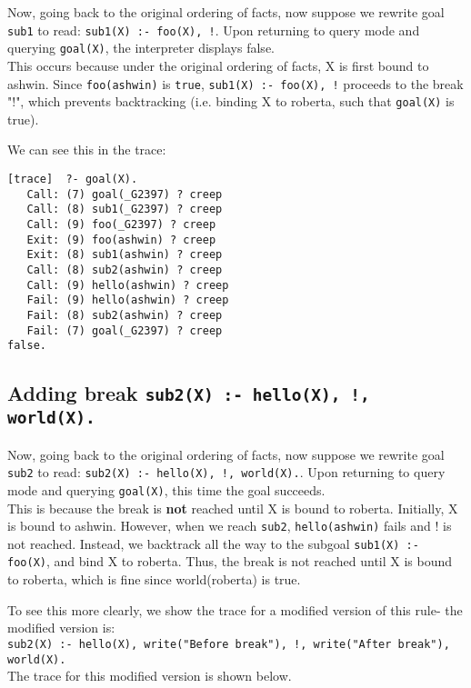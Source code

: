 \documentclass[paper=a4, fontsize=11pt]{scrartcl} %
\numberwithin{equation}{section} %
\numberwithin{figure}{section} %
\numberwithin{table}{section} %
\begin{document}
Now, going back to the original ordering of facts, now suppose we rewrite goal \texttt{sub1} to read: \texttt{sub1(X) :- foo(X), !}. Upon returning to query mode and querying \texttt{goal(X)}, the interpreter displays false.\\

This occurs because under the original ordering of facts, X is first bound to ashwin. Since \texttt{foo(ashwin)} is \texttt{true}, \texttt{sub1(X) :- foo(X), !} proceeds to the break "!", which prevents backtracking (i.e. binding X to roberta, such that \texttt{goal(X)} is true).

We can see this in the trace:

\begin{lstlisting}
[trace]  ?- goal(X).
   Call: (7) goal(_G2397) ? creep
   Call: (8) sub1(_G2397) ? creep
   Call: (9) foo(_G2397) ? creep
   Exit: (9) foo(ashwin) ? creep
   Exit: (8) sub1(ashwin) ? creep
   Call: (8) sub2(ashwin) ? creep
   Call: (9) hello(ashwin) ? creep
   Fail: (9) hello(ashwin) ? creep
   Fail: (8) sub2(ashwin) ? creep
   Fail: (7) goal(_G2397) ? creep
false.
\end{lstlisting}


\subsection{Adding break \texttt{sub2(X) :- hello(X), !, world(X).}}

Now, going back to the original ordering of facts, now suppose we rewrite goal \texttt{sub2} to read: \texttt{sub2(X) :- hello(X), !, world(X).}. Upon returning to query mode and querying \texttt{goal(X)}, this time the goal succeeds.\\

This is because the break is \textbf{not} reached until X is bound to roberta. Initially, X is bound to ashwin. However, when we reach \texttt{sub2}, \texttt{hello(ashwin)} fails and ! is not reached. Instead, we backtrack all the way to the subgoal \texttt{sub1(X) :- foo(X)}, and bind X to roberta. Thus, the break is not reached until X is bound to roberta, which is fine since world(roberta) is true.

To see this more clearly, we show the trace for a modified version of this rule- the modified version is:\\
\texttt{sub2(X) :- hello(X), write("Before break"), !, write("After break"), world(X).}\\

The trace for this modified version is shown below.
\end{document}
